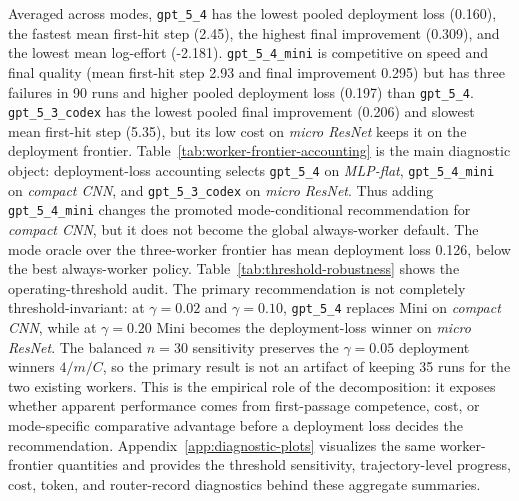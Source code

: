 \documentclass{article}
\begin{document}
Averaged across modes, \texttt{gpt\_5\_4} has the lowest pooled deployment loss (0.160), the fastest mean first-hit step (2.45), the highest final improvement (0.309), and the lowest mean log-effort (-2.181).
\texttt{gpt\_5\_4\_mini} is competitive on speed and final quality (mean first-hit step 2.93 and final improvement 0.295) but has three failures in 90 runs and higher pooled deployment loss (0.197) than \texttt{gpt\_5\_4}.
\texttt{gpt\_5\_3\_codex} has the lowest pooled final improvement (0.206) and slowest mean first-hit step (5.35), but its low cost on \textit{micro ResNet} keeps it on the deployment frontier.
Table~\ref{tab:worker-frontier-accounting} is the main diagnostic object: deployment-loss accounting selects \texttt{gpt\_5\_4} on \textit{MLP-flat}, \texttt{gpt\_5\_4\_mini} on \textit{compact CNN}, and \texttt{gpt\_5\_3\_codex} on \textit{micro ResNet}.
Thus adding \texttt{gpt\_5\_4\_mini} changes the promoted mode-conditional recommendation for \textit{compact CNN}, but it does not become the global always-worker default.
The mode oracle over the three-worker frontier has mean deployment loss 0.126, below the best always-worker policy.
Table~\ref{tab:threshold-robustness} shows the operating-threshold audit.
The primary recommendation is not completely threshold-invariant: at \(\gamma=0.02\) and \(\gamma=0.10\), \texttt{gpt\_5\_4} replaces Mini on \textit{compact CNN}, while at \(\gamma=0.20\) Mini becomes the deployment-loss winner on \textit{micro ResNet}.
The balanced \(n=30\) sensitivity preserves the \(\gamma=0.05\) deployment winners \(4/m/C\), so the primary result is not an artifact of keeping 35 runs for the two existing workers.
This is the empirical role of the decomposition: it exposes whether apparent performance comes from first-passage competence, cost, or mode-specific comparative advantage before a deployment loss decides the recommendation.
Appendix~\ref{app:diagnostic-plots} visualizes the same worker-frontier quantities and provides the threshold sensitivity, trajectory-level progress, cost, token, and router-record diagnostics behind these aggregate summaries.
\end{document}
